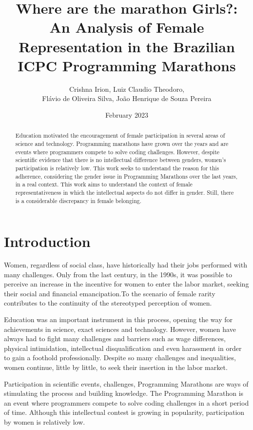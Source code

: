 \documentclass[12pt]{article}
\date{February 2023}
\title{Where are the marathon Girls?: An Analysis of Female Representation in the Brazilian ICPC Programming Marathons}
\author{Crishna Irion\inst{1}, Luiz Claudio Theodoro\inst{1}, \\Flávio de Oliveira Silva\inst{1}, João Henrique de Souza Pereira\inst{1} }
\begin{document}
 

\maketitle

\begin{abstract}
Education motivated the encouragement of female participation in several areas of science and technology. Programming marathons have grown over the years and are events where programmers compete to solve coding challenges. However, despite scientific evidence that there is no intellectual difference between genders, women's participation is relatively low. This work seeks to understand the reason for this adherence, considering the gender issue in Programming Marathons over the last years, in a real context. This work aims to understand the context of female representativeness in which the intellectual aspects do not differ in gender. Still, there is a considerable discrepancy in female belonging.

\end{abstract}


\section{Introduction}

Women, regardless of social class, have historically had their jobs performed with many challenges. Only from the last century, in the 1990s, it was possible to perceive an increase in the incentive for women to enter the labor market, seeking their social and financial emancipation.To \cite{maia_2016} the scenario of female rarity contributes to the continuity of the stereotyped perception of women.

Education was an important instrument in this process, opening the way for achievements in science, exact sciences and technology. However, women have always had to fight many challenges and barriers such as wage differences, physical intimidation, intellectual disqualification and even harassment in order to gain a foothold professionally. 
Despite so many challenges and inequalities, women continue, little by little, to seek their insertion in the labor market.

Participation in scientific events, challenges, Programming Marathons are ways of stimulating the process and building knowledge. The Programming Marathon is an event where programmers compete to solve coding challenges in a short period of time. Although this intellectual contest is growing in popularity, participation by women is relatively low.
\end{document}
